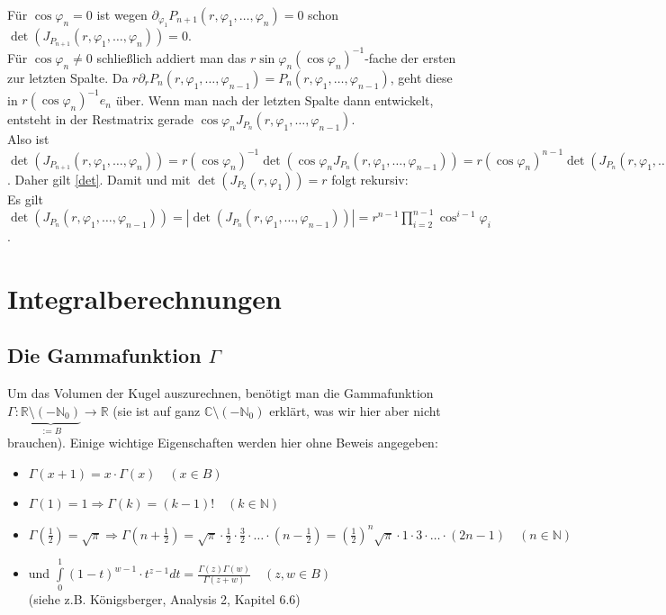 \documentclass[a4paper,11pt]{scrartcl}
\newcommand{\R}{{\ensuremath{\mathbb{R}}}}
\newcommand{\N}{{\ensuremath{\mathbb{N}}}}
\newcommand{\C}{{\ensuremath{\mathbb{C}}}}
\begin{document}
Für $\cos\varphi_n=0$ ist wegen $\partial_{\varphi_1}P_{n+1}(r,\varphi_1,\ldots,\varphi_n)=0$ schon $\det(J_{P_{n+1}}(r,\varphi_1,\ldots,\varphi_n))=0$.\\
Für $\cos\varphi_n\neq 0$ schließlich addiert man das $r\sin\varphi_n(\cos\varphi_n)^{-1}$-fache der ersten zur letzten Spalte. Da $r\partial_r P_n(r,\varphi_1,\ldots,\varphi_{n-1})=P_n(r,\varphi_1,\ldots,\varphi_{n-1})$, geht diese in $r(\cos\varphi_n)^{-1}e_n$ über. Wenn man nach der letzten Spalte dann entwickelt, entsteht in der Restmatrix gerade $\cos\varphi_n J_{P_n}(r,\varphi_1,\ldots,\varphi_{n-1})$.\\
Also ist $\det(J_{P_{n+1}}(r,\varphi_1,\ldots,\varphi_n))=r(\cos\varphi_n)^{-1}\det(\cos\varphi_n J_{P_n}(r,\varphi_1,\ldots,\varphi_{n-1})) = r(\cos\varphi_n)^{n-1}\det(J_{P_n}(r,\varphi_1,\ldots,\varphi_{n-1}))$. Daher gilt \eqref{det}.
Damit und mit $\det(J_{P_2}(r, \varphi_1))=r$ folgt rekursiv:\\
Es gilt $\det(J_{P_n}(r,\varphi_1,\ldots,\varphi_{n-1}))=|\det(J_{P_n}(r,\varphi_1,\ldots,\varphi_{n-1}))|=r^{n-1}\prod\limits_{i=2}^{n-1}\cos^{i-1}\varphi_i$.
\section{Integralberechnungen}
\subsection{Die Gammafunktion $\Gamma$}
Um das Volumen der Kugel auszurechnen, benötigt man die Gammafunktion \\$\Gamma:\underbrace{\R\setminus(-\N_0)}_{:=B}\to\R$ (sie ist auf ganz $\C\setminus(-\N_0)$ erklärt, was wir hier aber nicht brauchen). Einige wichtige Eigenschaften werden hier ohne Beweis angegeben:
\begin{itemize}
\item $\Gamma(x+1)=x\cdot\Gamma(x) \quad (x\in B)$
\item $\Gamma(1)=1\Rightarrow\Gamma(k)=(k-1)!\quad (k\in\N)$
\item $\Gamma(\frac{1}{2})=\sqrt{\pi}\Rightarrow\Gamma(n+\frac{1}{2})=\sqrt{\pi}\cdot\frac{1}{2}\cdot\frac{3}{2}\cdot\ldots\cdot (n-\frac{1}{2})=\left(\frac{1}{2}\right)^n\sqrt{\pi}\cdot 1\cdot 3\cdot\ldots\cdot (2n-1)\quad (n\in\N)$
\item und $\int\limits_0^1 (1-t)^{w-1}\cdot t^{z-1}dt=\frac{\Gamma(z)\Gamma(w)}{\Gamma(z+w)} \quad (z,w\in B)$\\ (siehe z.B. Königsberger, Analysis 2, Kapitel 6.6)
\end{itemize}
\end{document}
